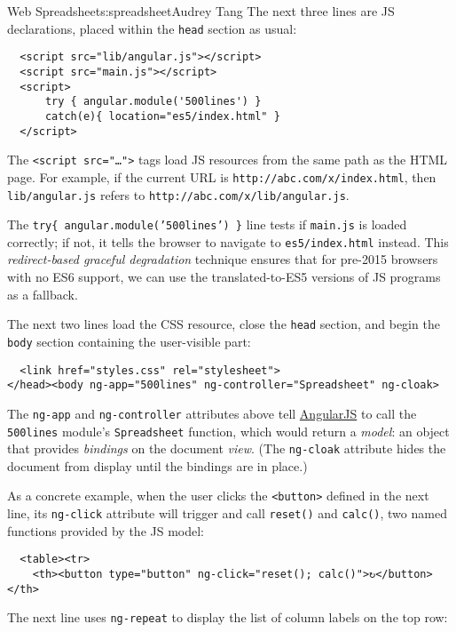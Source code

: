 \begin{aosachapter}{Web Spreadsheet}{s:spreadsheet}{Audrey Tang}
The next three lines are JS declarations, placed within the
\texttt{head} section as usual:

\begin{verbatim}
  <script src="lib/angular.js"></script>
  <script src="main.js"></script>
  <script>
      try { angular.module('500lines') }
      catch(e){ location="es5/index.html" }
  </script>
\end{verbatim}

The \texttt{\textless{}script src="\ldots{}"\textgreater{}} tags load JS
resources from the same path as the HTML page. For example, if the
current URL is \texttt{http://abc.com/x/index.html}, then
\texttt{lib/angular.js} refers to
\texttt{http://abc.com/x/lib/angular.js}.

The \texttt{try\{ angular.module('500lines') \}} line tests if
\texttt{main.js} is loaded correctly; if not, it tells the browser to
navigate to \texttt{es5/index.html} instead. This \emph{redirect-based
graceful degradation} technique ensures that for pre-2015 browsers with
no ES6 support, we can use the translated-to-ES5 versions of JS programs
as a fallback.

The next two lines load the CSS resource, close the \texttt{head}
section, and begin the \texttt{body} section containing the user-visible
part:

\begin{verbatim}
  <link href="styles.css" rel="stylesheet">
</head><body ng-app="500lines" ng-controller="Spreadsheet" ng-cloak>
\end{verbatim}

The \texttt{ng-app} and \texttt{ng-controller} attributes above tell
\href{http://angularjs.org/}{AngularJS} to call the \texttt{500lines}
module's \texttt{Spreadsheet} function, which would return a
\emph{model}: an object that provides \emph{bindings} on the document
\emph{view}. (The \texttt{ng-cloak} attribute hides the document from
display until the bindings are in place.)

As a concrete example, when the user clicks the
\texttt{\textless{}button\textgreater{}} defined in the next line, its
\texttt{ng-click} attribute will trigger and call \texttt{reset()} and
\texttt{calc()}, two named functions provided by the JS model:

\begin{verbatim}
  <table><tr>
    <th><button type="button" ng-click="reset(); calc()">↻</button></th>
\end{verbatim}

The next line uses \texttt{ng-repeat} to display the list of column
labels on the top row:


\end{aosachapter}
